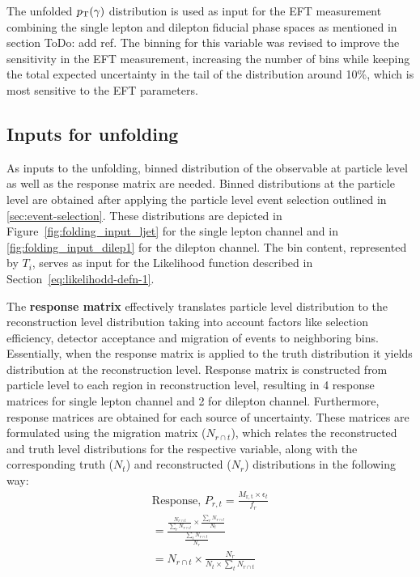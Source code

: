 The unfolded $p_{\text{T}}(\gamma)$ distribution is used as input for the EFT measurement combining the single lepton and dilepton fiducial phase spaces as mentioned in section {ToDo: add ref}. The binning for this variable was revised to improve the sensitivity in the EFT measurement, increasing the number of bins while keeping the total expected uncertainty in the tail of the distribution around 10\%, which is most sensitive to the EFT parameters.  



\subsection{Inputs for unfolding}
\label{sec:inputs-for-unfolding}
As inputs to the unfolding, binned distribution of the observable at particle level as well as the response matrix are needed. Binned distributions at the particle level are obtained after applying the particle level event selection outlined in \cref{sec:event-selection}. These distributions are depicted in Figure~\ref{fig:folding_input_ljet} for the single lepton channel and in \cref{fig:folding_input_dilep1} for the dilepton channel. The bin content, represented by $T_{i}$, serves as input for the Likelihood function described in Section~\ref{eq:likelihodd-defn-1}.

The \textbf{response matrix} effectively translates particle level distribution to the reconstruction level distribution taking into account factors like selection efficiency, detector acceptance and migration of events to neighboring bins. Essentially, when the response matrix is applied to the truth distribution it yields distribution at the reconstruction level. Response matrix is constructed from particle level to each region in reconstruction level, resulting in 4 response matrices for single lepton channel and 2 for dilepton channel. Furthermore, response matrices are obtained for each source of uncertainty. These matrices are formulated using the migration matrix ($N_{r \cap t}$), which relates the reconstructed and truth level distributions for the respective variable, along with the corresponding truth ($N_{t}$) and reconstructed ($N_{r}$) distributions in the following way:
\begin{align}
    \text{Response, } P_{r,t} = \frac{M_{\mathrm{r,t}} \times \epsilon_{t}}{f_{r}}\\
    = \frac{\frac{N_{r \cap t}}{\sum_{r} N_{r \cap t}} \times \frac{\sum_{r} N_{r \cap t}}{N_{t}}}{\frac{\sum_{t} N_{r \cap t}}{N_{r}}}\\
    = N_{r \cap t} \times \frac{N_{r}}{N_{t}\times \sum_{t} N_{r \cap t}}
\end{align}


